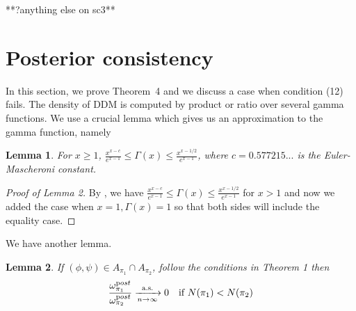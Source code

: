 \documentclass[aoas,preprint]{imsart}
\newtheorem{lemma}{Lemma}
\begin{document}
**?anything else on sc3**





\section{Posterior consistency}
In this section, we prove Theorem~4 and we discuss a case when condition (12) fails.
The density of DDM is computed by product or ratio over several gamma functions.
We use a crucial lemma which gives us an approximation to the gamma function, namely

\begin{lemma}
For $x \geq 1$, $\frac{x^{x - c}}{e^{x - 1}} \leq \Gamma(x) \leq \frac{x^{x-1/2}}{e^{x - 1}}$, where $c = 0.577215...$ is the Euler-Mascheroni constant.
\end{lemma}

\begin{proof}[Proof of Lemma 2]
By \citep{ineq},  we have $\frac{x^{x - c}}{e^{x - 1}} \leq \Gamma(x) \leq \frac{x^{x-1/2}}{e^{x - 1}}$ for $x > 1$ and now we added the case when $x = 1, \Gamma(x) = 1$ so that both sides will include the equality case. 
\end{proof}





We have another lemma.
\begin{lemma}
 If $(\phi, \psi) \in A_{\pi_1} \cap A_{\pi_2}$, follow the conditions in Theorem 1 then 
 \begin{eqnarray*}
    \frac{\omega_{\pi_1}^{\text post}}{\omega_{\pi_2}^{\text post}} \xrightarrow[n\rightarrow\infty]{\text{a.s.}} 0 \quad \text{if } N(\pi_1) < N(\pi_2)\\
 \end{eqnarray*}
\end{lemma}
\end{document}
